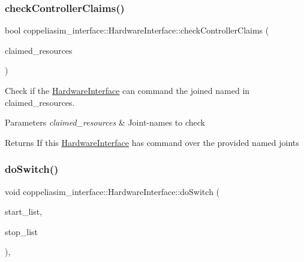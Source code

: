 \subsubsection{\texorpdfstring{check\+Controller\+Claims()}{checkControllerClaims()}}
{\footnotesize\ttfamily bool coppeliasim\+\_\+interface\+::\+Hardware\+Interface\+::check\+Controller\+Claims (\begin{DoxyParamCaption}\item[{const std\+::set$<$ std\+::string $>$ \&}]{claimed\+\_\+resources }\end{DoxyParamCaption})\hspace{0.3cm}{\ttfamily [protected]}}



Check if the \hyperlink{classcoppeliasim__interface_1_1HardwareInterface}{Hardware\+Interface} can command the joined named in claimed\+\_\+resources. 


\begin{DoxyParams}{Parameters}
{\em claimed\+\_\+resources} & Joint-\/names to check \\
\hline
\end{DoxyParams}
\begin{DoxyReturn}{Returns}
If this \hyperlink{classcoppeliasim__interface_1_1HardwareInterface}{Hardware\+Interface} has command over the provided named joints 
\end{DoxyReturn}
\mbox{\label{classcoppeliasim__interface_1_1HardwareInterface_aae36a63c5125172387cfcbf21f9a1c24}} 
\subsubsection{\texorpdfstring{do\+Switch()}{doSwitch()}}
{\footnotesize\ttfamily void coppeliasim\+\_\+interface\+::\+Hardware\+Interface\+::do\+Switch (\begin{DoxyParamCaption}\item[{const std\+::list$<$ hardware\+\_\+interface\+::\+Controller\+Info $>$ \&}]{start\+\_\+list,  }\item[{const std\+::list$<$ hardware\+\_\+interface\+::\+Controller\+Info $>$ \&}]{stop\+\_\+list }\end{DoxyParamCaption})\hspace{0.3cm}{\ttfamily [override]}, {\ttfamily [virtual]}}



